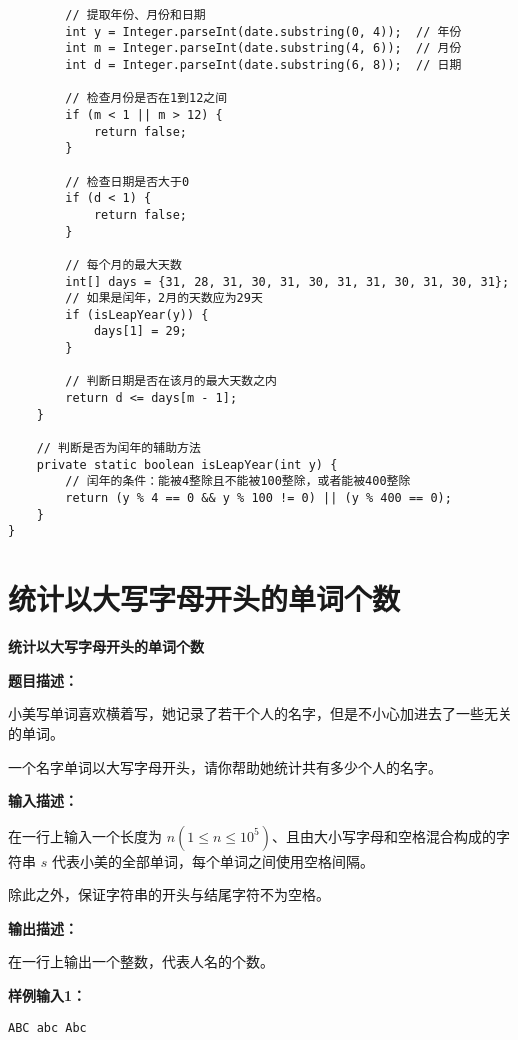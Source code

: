 \documentclass[a4paper]{ctexart}
\begin{document}
\begin{lstlisting}
		// 提取年份、月份和日期
		int y = Integer.parseInt(date.substring(0, 4));  // 年份
		int m = Integer.parseInt(date.substring(4, 6));  // 月份
		int d = Integer.parseInt(date.substring(6, 8));  // 日期
		
		// 检查月份是否在1到12之间
		if (m < 1 || m > 12) {
			return false;
		}
		
		// 检查日期是否大于0
		if (d < 1) {
			return false;
		}
		
		// 每个月的最大天数
		int[] days = {31, 28, 31, 30, 31, 30, 31, 31, 30, 31, 30, 31};
		// 如果是闰年，2月的天数应为29天
		if (isLeapYear(y)) {
			days[1] = 29;
		}
		
		// 判断日期是否在该月的最大天数之内
		return d <= days[m - 1];
	}
	
	// 判断是否为闰年的辅助方法
	private static boolean isLeapYear(int y) {
		// 闰年的条件：能被4整除且不能被100整除，或者能被400整除
		return (y % 4 == 0 && y % 100 != 0) || (y % 400 == 0);
	}
}

\end{lstlisting}


\newpage

\section{统计以大写字母开头的单词个数}

\begin{center}
	\Large \textbf{统计以大写字母开头的单词个数}
\end{center}

\vspace{10pt}

\noindent\textbf{题目描述：}

小美写单词喜欢横着写，她记录了若干个人的名字，但是不小心加进去了一些无关的单词。

一个名字单词以大写字母开头，请你帮助她统计共有多少个人的名字。

\noindent\textbf{输入描述：}

在一行上输入一个长度为 $n (1\leq n \leq 10^5)$、且由大小写字母和空格混合构成的字符串 $s$ 代表小美的全部单词，每个单词之间使用空格间隔。

除此之外，保证字符串的开头与结尾字符不为空格。

\noindent\textbf{输出描述：} 

在一行上输出一个整数，代表人名的个数。

\noindent\textbf{样例输入1：}
\lstset{numbers=none}
\begin{lstlisting}
ABC abc Abc
\end{lstlisting}
\lstset{numbers=left}
\end{document}
